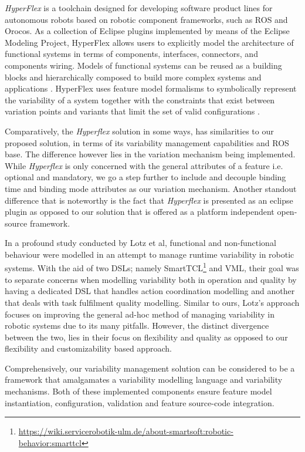 \documentclass[conference]{IEEEtran}
\newcommand{\foot}[1]{\footnote{\url{#1}}}
\begin{document}
\textit{HyperFlex} is a toolchain designed for developing software product lines for autonomous robots based on robotic component frameworks, such as ROS and Orocos.
As a collection of Eclipse plugins implemented by means of the Eclipse Modeling Project, HyperFlex allows users to explicitly model the architecture of functional systems in terms of components, interfaces, connectors, and components wiring. Models of functional systems can be reused as a building blocks and hierarchically composed to build more complex systems and applications \cite{ros-ref}. HyperFlex uses feature model formalisms to symbolically represent the variability of a system together with the constraints that exist between variation points and variants that limit the set of valid configurations \cite{ros-ref}.

Comparatively, the \textit{Hyperflex} solution in some ways, has similarities to our proposed solution, in terms of its variability management capabilities and ROS base. The difference however lies in the variation mechanism being implemented. While \textit{Hyperflex} is only concerned with the general attributes of a feature i.e. optional and mandatory, we go a step further to include and decouple binding time and binding mode attributes as our variation mechanism. Another standout difference that is noteworthy is the fact that \textit{Hyperflex} is presented as an eclipse plugin as opposed to our solution that is offered as a platform independent open-source framework.

In a profound study conducted by Lotz et al\cite{man-runt-var-lotz}, functional and non-functional behaviour were modelled in an attempt to manage runtime variability in robotic systems. With the aid of two DSLs; namely SmartTCL\foot{https://wiki.servicerobotik-ulm.de/about-smartsoft:robotic-behavior:smarttcl} and VML\cite{vml}, their goal was to separate concerns when modelling variability both in operation and quality by having a dedicated DSL that handles action coordination modelling and another that deals with task fulfilment quality modelling. Similar to ours, Lotz's approach focuses on improving the general ad-hoc method of managing variability in robotic systems due to its many pitfalls. However, the distinct divergence between the two, lies in their focus on flexibility and quality as opposed to our flexibility and customizability based approach.

Comprehensively, our variability management solution can be considered to be a framework that amalgamates a variability modelling language and variability mechanisms. Both of these implemented components ensure feature model instantiation, configuration, validation and feature source-code integration.
\end{document}
